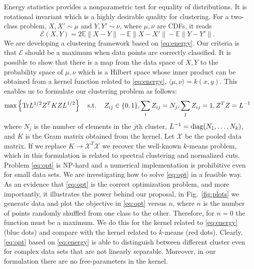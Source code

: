 \documentclass[simplex.tex]{subfiles}
\begin{document}
Energy statistics provides a nonparametric test for equality of distributions.
It is rotational invariant which is a highly desirable quality
for clustering. For a two-class problem, $X,X' \sim \mu$ and 
$Y,Y' \sim \nu$, where $\mu,\nu$ are CDFs, it reads
\begin{equation}\label{eq:energy}
\mathcal{E}(X,Y) = 2\mathbb{E} \| X - Y \|
- \mathbb{E} \| X - X' \| - \mathbb{E} \| Y - Y'\|.
\end{equation}
We are developing a clustering framework based on \ref{eq:energy}.
Our criteria is that $\mathcal{E}$ should be a maximum when data points are
correctly classified.
%
It is possible to show that there is a map from the data space of $X,Y$
to the probability space of $\mu,\nu$ which is a Hilbert space whose
inner product  can be obtained from a kernel 
function related to \ref{eq:energy}, 
$\langle \mu, \nu \rangle
= k(x,y)$.
This enables us to formulate our clustering problem as follows:
\begin{equation}\label{eq:opt}
\textnormal{max} \left\{ \textnormal{Tr} L^{1/2} Z^T K Z L^{1/2} \right\}
\quad
\textnormal{s.t.} \quad 
\, Z_{ij}\in\{0,1\}, \sum_i Z_{ij} = N_j, \sum_j Z_{ij}=1,
Z^T Z = L^{-1}
\end{equation}
where $N_j$ is the number of elements in the $j$th cluster,
$L^{-1}=\textnormal{diag}(N_1,\dotsc,N_k)$, and $K$ is the Gram 
matrix obtained
from the kernel. Let $\mathcal{X}$ be the pooled data matrix. If we
replace $K \to \mathcal{X}^T \mathcal{X}$ we recover the well-known
$k$-means problem, which in this formulation is related
to spectral clustering and normalized cuts. Problem
\ref{eq:opt} is 
NP-hard and a numerical implementation is prohibitive even
for small data sets. We are investigating how to 
solve \ref{eq:opt} in
a feasible way. As an evidence that \ref{eq:opt} is the correct optimization
problem, and more importantly, it illustrates the power behind our proposal,
in Fig.~\ref{fig:plots} we generate data and plot the objective in 
\ref{eq:opt} versus $n$, where $n$ is the number of points randomly shuffled
from one class to the other. Therefore, for $n=0$ the function must be a
maximum. We do this for the kernel related to \ref{eq:energy} (blue dots)
and compare with the kernel related to $k$-means (red dots).
Clearly, \ref{eq:opt} based on \ref{eq:energy} is able to distinguish
between different cluster even for complex data sets that are
not linearly separable. Moreover, in our formulation
there are no free-parameters in the kernel.
\end{document}

